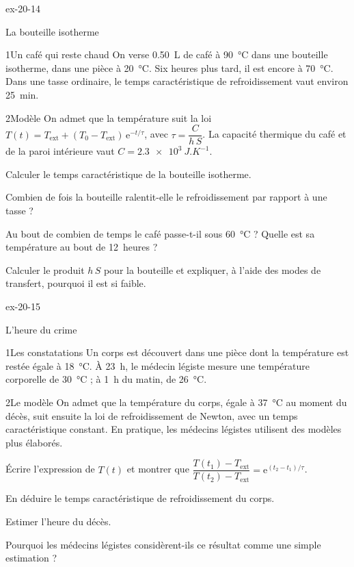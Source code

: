\begin{blocLivre}{ex-20-14}
\begin{exercice}[3]{La bouteille isotherme}
\begin{docu}{1}{Un café qui reste chaud}
On verse \qty{0,50}{L} de café à \qty{90}{\degreeCelsius} dans une bouteille isotherme, dans une pièce à \qty{20}{\degreeCelsius}. Six
heures plus tard, il est encore à \qty{70}{\degreeCelsius}. Dans une tasse ordinaire, le temps caractéristique de refroidissement
vaut environ \qty{25}{min}.
\end{docu}
\begin{docu}{2}{Modèle}
On admet que la température suit la loi $T(t)=T_\mathrm{ext}+(T_0-T_\mathrm{ext})\,\mathrm{e}^{-t/\tau}$, avec $\tau=\dfrac{C}{h\,S}$. La
capacité thermique du café et de la paroi intérieure vaut $C=\qty{2,3e3}{J.K^{-1}}$.
\end{docu}
\begin{questions}
\item Calculer le temps caractéristique de la bouteille isotherme.
\item Combien de fois la bouteille ralentit-elle le refroidissement par rapport à une tasse ?
\item \initiative Au bout de combien de temps le café passe-t-il sous \qty{60}{\degreeCelsius} ? Quelle est sa température au bout de
12~heures ?
\item Calculer le produit $h\,S$ pour la bouteille et expliquer, à l'aide des modes de transfert, pourquoi il est si
faible.
\end{questions}
\end{exercice}
\end{blocLivre}
\begin{blocLivre}{ex-20-15}
\begin{exercice}[3]{L'heure du crime}
\begin{docu}{1}{Les constatations}
Un corps est découvert dans une pièce dont la température est restée égale à \qty{18}{\degreeCelsius}. À 23~h, le médecin
légiste mesure une température corporelle de \qty{30}{\degreeCelsius} ; à 1~h du matin, de \qty{26}{\degreeCelsius}.
\end{docu}
\begin{docu}{2}{Le modèle}
On admet que la température du corps, égale à \qty{37}{\degreeCelsius} au moment du décès, suit ensuite la loi de refroidissement
de Newton, avec un temps caractéristique constant. En pratique, les médecins légistes utilisent des modèles plus
élaborés.
\end{docu}
\begin{questions}
\item Écrire l'expression de $T(t)$ et montrer que $\dfrac{T(t_1)-T_\mathrm{ext}}{T(t_2)-T_\mathrm{ext}}=\mathrm{e}^{(t_2-t_1)/\tau}$.
\item En déduire le temps caractéristique de refroidissement du corps.
\item \initiative Estimer l'heure du décès.
\item Pourquoi les médecins légistes considèrent-ils ce résultat comme une simple estimation ?
\end{questions}
\end{exercice}
\end{blocLivre}
